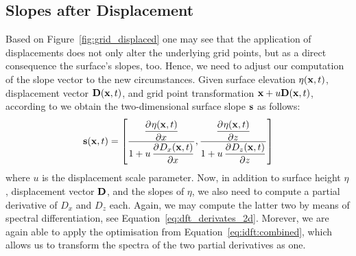 \subsection{Slopes after Displacement}
%
Based on Figure~\ref{fig:grid_displaced} one may see that the application 
of displacements does not only alter the underlying grid points, but as a 
direct consequence the surface's slopes, too. Hence, we need to adjust our 
computation of the slope vector to the new circumstances. Given surface 
elevation $\eta(\mathbf{x},t)$, displacement vector $\mathbf{D}(\mathbf{x},t)$,
and grid point transformation $\mathbf{x} + u\mathbf{D}(\mathbf{x},t)$,
according to \citet[private communication]{article:whitecaps} we obtain the
two-dimensional surface slope $\mathbf{s}$ as follows:
\begin{equation}
\mvec{s}(\mvec{x},t) = \left[\frac{\dpd{\eta(\mvec{x},t)}{x}}{1 + u 
\dpd{D_x(\mvec{x},t)}{x}}, \frac{\dpd{\eta(\mvec{x},t)}{z}}{1 + u 
\dpd{D_z(\mvec{x},t)}{z}}\right]
\end{equation}
where $u$ is the displacement scale parameter. Now, in addition
to surface height $\eta$, displacement vector $\mathbf{D}$, and the slopes of $\eta$,
we also need to compute a partial derivative of $D_x$ and $D_z$ each.
Again, we may compute the latter two by means of spectral
differentiation, see Equation~\ref{eq:dft_derivates_2d}. Morever, we are again
able to apply the optimisation from Equation~\ref{eq:idft:combined}, which allows
us to transform the spectra of the two partial derivatives as one.
%

